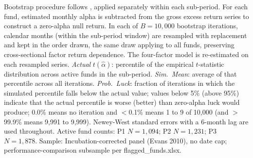 \begin{table}[!htbp]
\begin{minipage}{\tabletempwidth}
\begin{singlespace}
Bootstrap procedure follows \textcite{FamaFrench2010}, applied separately within each sub-period. For each fund, estimated monthly alpha is subtracted from the gross excess return series to construct a zero-alpha null return. In each of $B = 10{,}000$ bootstrap iterations, calendar months (within the sub-period window) are resampled with replacement and kept in the order drawn, the same draw applying to all funds, preserving cross-sectional factor return dependence. The \textcite{Carhart1997} four-factor model is re-estimated on each resampled series. \textit{Actual} $t(\hat{\alpha})$: percentile of the empirical $t$-statistic distribution across active funds in the sub-period. \textit{Sim.\ Mean}: average of that percentile across all iterations. \textit{Prob.\ Luck}: fraction of iterations in which the simulated percentile falls below the actual value; values below 5\% (above 95\%) indicate that the actual percentile is worse (better) than zero-alpha luck would produce; 0.0\% means no iteration and $<$0.1\% means 1 to 9 of 10,000 (and $>$99.9\% means 9,991 to 9,999). Newey-West standard errors with a 6-month lag are used throughout. Active fund counts: P1 $N = 1{,}094$; P2 $N = 1{,}231$; P3 $N = 1{,}878$. Sample: Incubation-corrected panel (Evans 2010), no date cap; performance-comparison subsample per flagged\_funds.xlsx.
\end{singlespace}
\end{minipage}
\end{table}

